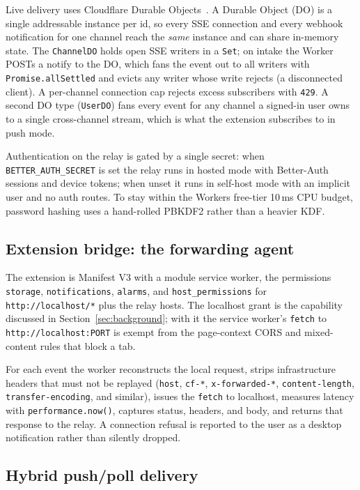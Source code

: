 \documentclass[11pt]{article}
\begin{document}
Live delivery uses Cloudflare Durable Objects~\cite{durableobjects}. A Durable
Object (DO) is a single addressable instance per id, so every SSE connection
and every webhook notification for one channel reach the \emph{same} instance
and can share in-memory state. The \texttt{ChannelDO} holds open SSE writers in
a \texttt{Set}; on intake the Worker POSTs a notify to the DO, which fans the
event out to all writers with \texttt{Promise.allSettled} and evicts any writer
whose write rejects (a disconnected client). A per-channel connection cap
rejects excess subscribers with \texttt{429}. A second DO type
(\texttt{UserDO}) fans every event for any channel a signed-in user owns to a
single cross-channel stream, which is what the extension subscribes to in
push mode.

Authentication on the relay is gated by a single secret: when
\texttt{BETTER\_AUTH\_SECRET} is set the relay runs in hosted mode with
Better-Auth sessions and device tokens; when unset it runs in self-host mode
with an implicit user and no auth routes. To stay within the Workers free-tier
10\,ms CPU budget, password hashing uses a hand-rolled PBKDF2 rather than a
heavier KDF.

\subsection{Extension bridge: the forwarding agent}
\label{sec:bridge}

The extension is Manifest V3 with a module service worker, the permissions
\texttt{storage}, \texttt{notifications}, \texttt{alarms}, and
\texttt{host\_permissions} for \texttt{http://localhost/*} plus the relay hosts.
The localhost grant is the capability discussed in
Section~\ref{sec:background}; with it the service worker's \texttt{fetch} to
\texttt{http://localhost:PORT} is exempt from the page-context CORS and
mixed-content rules that block a tab.

For each event the worker reconstructs the local request, strips
infrastructure headers that must not be replayed (\texttt{host},
\texttt{cf-*}, \texttt{x-forwarded-*}, \texttt{content-length},
\texttt{transfer-encoding}, and similar), issues the \texttt{fetch} to
localhost, measures latency with \texttt{performance.now()}, captures status,
headers, and body, and returns that response to the relay. A connection refusal
is reported to the user as a desktop notification rather than silently dropped.

\subsection{Hybrid push/poll delivery}
\label{sec:hybrid}
\end{document}
